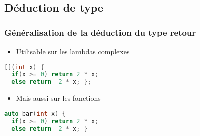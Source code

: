 \documentclass[C++.tex]{subfiles}
\begin{document}
\subsection*{Déduction de type}
\begin{frame}[fragile]
	\frametitle{Généralisation de la déduction du type retour}
	\begin{itemize}
		\item Utilisable sur les lambdas complexes
	\end{itemize}

	\begin{lstlisting}[language=C++]
[](int x) { 
  if(x >= 0) return 2 * x; 
  else return -2 * x; };\end{lstlisting}

	\begin{itemize}
		\item Mais aussi sur les fonctions
	\end{itemize}

	\begin{lstlisting}[language=C++]
auto bar(int x) {
  if(x >= 0) return 2 * x; 
  else return -2 * x; }\end{lstlisting}
\end{frame}
\end{document}

